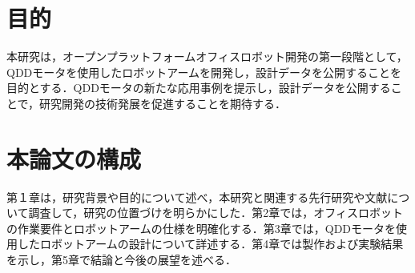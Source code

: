 
\section{目的}
本研究は，オープンプラットフォームオフィスロボット開発の第一段階として，QDDモータを使用したロボットアームを開発し，設計データを公開することを目的とする．QDDモータの新たな応用事例を提示し，設計データを公開することで，研究開発の技術発展を促進することを期待する．
\section{本論文の構成}
第１章は，研究背景や目的について述べ，本研究と関連する先行研究や文献について調査して，研究の位置づけを明らかにした．第2章では，オフィスロボットの作業要件とロボットアームの仕様を明確化する．第3章では，QDDモータを使用したロボットアームの設計について詳述する．第4章では製作および実験結果を示し，第5章で結論と今後の展望を述べる．

\newpage